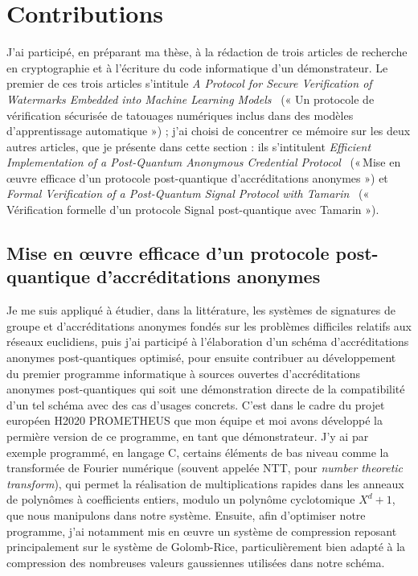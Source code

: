 
\section{Contributions} %
\label{sec:contributions}

J’ai participé, en préparant ma thèse, à la rédaction de trois articles de recherche en
cryptographie et à l’écriture du code informatique d’un démonstrateur.
Le premier de ces trois articles s’intitule \emph{A Protocol for Secure Verification of Watermarks
Embedded into Machine Learning Models}~\cite{IHMMSec:KTBBS21} (« Un protocole de vérification sécurisée de tatouages
numériques inclus dans des modèles d’apprentissage automatique ») ; j’ai choisi de concentrer ce
mémoire sur les deux autres articles, que je présente dans cette section : ils s’intitulent
\emph{Efficient Implementation of a Post-Quantum Anonymous Credential Protocol}~\cite{ARES:CRSS23}
(« Mise en œuvre efficace d’un protocole post-quantique d’accréditations anonymes ») et \emph{Formal
Verification of a Post-Quantum Signal Protocol with Tamarin}~\cite{BCRS} (« Vérification formelle
d’un protocole Signal post-quantique avec Tamarin »).


\subsection[Premier article]{Mise en œuvre efficace d’un protocole post-quantique d’accréditations anonymes~\cite{ARES:CRSS23}} %
\label{sub:paper_1}


Je me suis appliqué à étudier, dans la littérature, les systèmes de signatures de groupe et
d’accréditations anonymes fondés sur les problèmes difficiles relatifs aux réseaux euclidiens, puis 
j’ai participé à l’élaboration d’un schéma d’accréditations anonymes post-quantiques optimisé, pour
ensuite contribuer au développement du premier programme informatique à sources
ouvertes d’accréditations anonymes post-quantiques qui soit une démonstration directe de la
compatibilité d’un tel schéma avec des cas d’usages concrets.
C’est dans le cadre du projet européen H2020 PROMETHEUS que mon équipe et moi avons développé la permière version de ce programme, en tant que démonstrateur.
J’y ai par exemple programmé, en langage C, certains éléments de bas niveau comme la transformée de Fourier numérique (souvent appelée NTT, pour \textit{number theoretic transform}), qui permet la réalisation de multiplications rapides dans les anneaux de polynômes à coefficients entiers, modulo un polynôme cyclotomique $X^d + 1$, que nous manipulons dans notre système. Ensuite, afin d’optimiser notre programme, j’ai notamment mis en œuvre un système de compression reposant principalement sur le système de Golomb-Rice, particulièrement bien adapté à la compression des nombreuses valeurs gaussiennes utilisées dans notre schéma.

